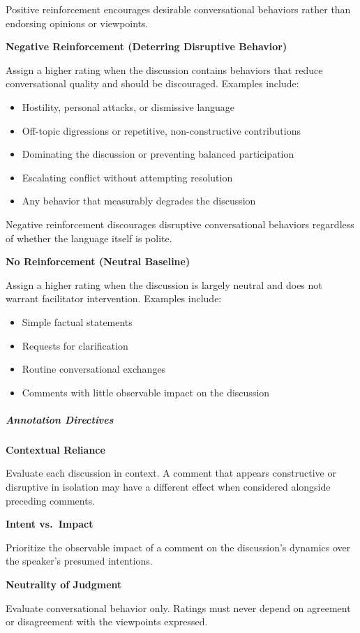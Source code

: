 \documentclass[11pt]{article}
\theoremstyle{definition}
\theoremstyle{plain}
\begin{document}
Positive reinforcement encourages desirable conversational behaviors rather than endorsing opinions or viewpoints.

\textbf{Negative Reinforcement (Deterring Disruptive Behavior)}

Assign a higher rating when the discussion contains behaviors that reduce conversational quality and should be discouraged. Examples include:
\begin{itemize}
	\item Hostility, personal attacks, or dismissive language
	\item Off-topic digressions or repetitive, non-constructive contributions
	\item Dominating the discussion or preventing balanced participation
	\item Escalating conflict without attempting resolution
	\item Any behavior that measurably degrades the discussion
\end{itemize}

Negative reinforcement discourages disruptive conversational behaviors regardless of whether the language itself is polite.

\textbf{No Reinforcement (Neutral Baseline)}

Assign a higher rating when the discussion is largely neutral and does not warrant facilitator intervention. Examples include:
\begin{itemize}
	\item Simple factual statements
	\item Requests for clarification
	\item Routine conversational exchanges
	\item Comments with little observable impact on the discussion
\end{itemize}

\subparagraph{Annotation Directives}

\textbf{Contextual Reliance}

Evaluate each discussion in context. A comment that appears constructive or disruptive in isolation may have a different effect when considered alongside preceding comments.

\textbf{Intent vs.\ Impact}

Prioritize the observable impact of a comment on the discussion's dynamics over the speaker's presumed intentions.

\textbf{Neutrality of Judgment}

Evaluate conversational behavior only. Ratings must never depend on agreement or disagreement with the viewpoints expressed.
\end{document}
